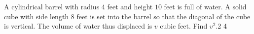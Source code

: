 A cylindrical barrel with radius $4$ feet and height $10$ feet is full of water. A solid cube with side length $8$ feet is set into the barrel so that the diagonal of the cube is vertical. The volume of water thus displaced is $v$ cubic feet. Find $v^2$.2 4